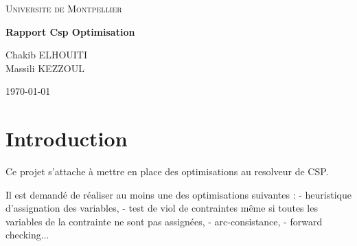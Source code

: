\documentclass[oneside,13pt,a4paper]{article}
\title{}
\author{
    Chakib ELHOUITI \and
    Massili KEZZOUL \and
}
\date{\today}
\begin{document}
\begin{titlepage}
	\centering
	{\scshape\LARGE Universite de Montpellier\par}
	{\scshape\Large\par}
	\vspace{1.5cm}
	{\huge\bfseries Rapport Csp Optimisation\par}
	\vspace{2cm}
	{\Large\itshape
		
		Chakib ELHOUITI \\
		Massili KEZZOUL \\
		
		\par}

	\vspace{2cm}

	\begin{figure}[h]
	\end{figure}

	\par\vspace{1cm}

	\vfill

	{\large \today\par}
\end{titlepage}





\parskip=5pt

\tableofcontents

\parskip=5pt

\section{Introduction}
Ce projet s'attache à mettre en place des optimisations au resolveur de CSP.

Il est demandé de réaliser au moins une des optimisations suivantes : 
- heuristique d'assignation des variables, 
- test de viol de contraintes même si toutes les variables de la contrainte ne sont pas assignées, 
- arc-consistance, 
- forward checking...
\end{document}
